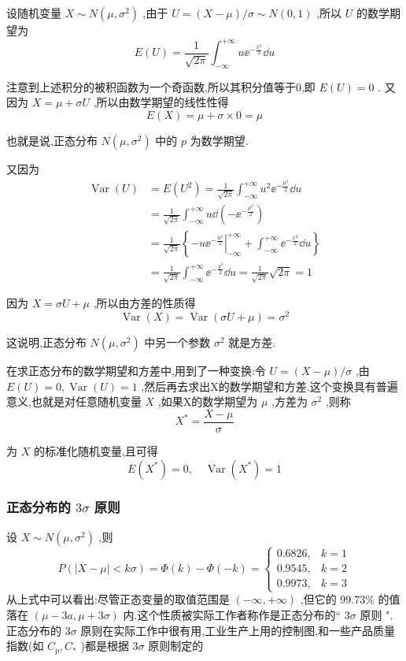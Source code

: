 设随机变量 $ X \sim N\left(\mu, \sigma^{2}\right) $ ,由于 $ U=(X-\mu) / \sigma \sim N(0,1) $ ,所以 $ U $ 的数学期望为
\[
E(U)=\frac{1}{\sqrt{2 \pi}} \int_{-\infty}^{+\infty} u \ee ^{-\frac{x^{2}}{2}} \dd u
\]

注意到上述积分的被积函数为一个奇函数,所以其积分值等于0,即 $ E(U)=0 $ .
又因为 $ X=\mu+\sigma U $ ,所以由数学期望的线性性得
\[
E(X)=\mu+\sigma \times 0=\mu
\]

也就是说,正态分布 $ N\left(\mu, \sigma^{2}\right) $ 中的 $ p $ 为数学期望.

又因为
\[
\begin{array}{ll}
{\operatorname{Var}(U)} & {=E\left(U^{2}\right)=\frac{1}{\sqrt{2 \pi}} \int_{-\infty}^{+\infty} u^{2} \ee ^{-\frac{\mu^{2}}{2}} \dd u} \\ 
{} & {=\frac{1}{\sqrt{2 \pi}} \int_{-\infty}^{+\infty} u \dd\left(-\ee ^{-\frac{\mu^{2}}{2}}\right)} \\ 
{} & {=\frac{1}{\sqrt{2 \pi}}\left\{-u\left.\ee ^{-\frac{u^{2}}{2}}\right|_{-\infty} ^{+\infty}+\int_{-\infty}^{+\infty} \ee ^{-\frac{x^{2}}{2}} \dd u\right\}} \\ 
{} & {=\frac{1}{\sqrt{2 \pi}} \int_{-\infty}^{+\infty} \ee ^{-\frac{y^{2}}{2}} \dd u=\frac{1}{\sqrt{2 \pi}} \sqrt{2 \pi}=1}
\end{array}
\]

因为 $ X=\sigma U+\mu $ ,所以由方差的性质得
\[
\operatorname{Var}(X)=\operatorname{Var}(\sigma U+\mu)=\sigma^{2}
\]

这说明,正态分布 $ N\left(\mu, \sigma^{2}\right) $ 中另一个参数 $ \sigma^{2} $ 就是方差.

在求正态分布的数学期望和方差中,用到了一种变换:令 $ U=(X-\mu) / \sigma $ ,由 $ E(U)=0, \operatorname{Var}(U)=1 $ ,然后再去求出X的数学期望和方差.这个变换具有普遍意义,也就是对任意随机变量 $ X $ ,如果X的数学期望为 $ \mu $ ,方差为 $ \sigma^{2} $ ,则称
\[
X^{*}=\frac{X-\mu}{\sigma}
\]

为 $ X $ 的标准化随机变量,且可得
\[
E\left(X^{*}\right)=0, \quad \operatorname{Var}\left(X^{*}\right)=1
\]

\subsubsection{正态分布的 $ 3\sigma $ 原则}
设 $ X \sim N\left(\mu, \sigma^{2}\right) $ ,则
\begin{equation}
P(|X-\mu|<k \sigma)=\Phi(k)-\Phi(-k)=\left\{\begin{array}{ll}{0.6826,} & {k=1} \\ {0.9545,} & {k=2} \\ {0.9973,} & {k=3}\end{array}\right. \label{eq:2.5.5}
\end{equation}
从上式中可以看出:尽管正态变量的取值范围是 $ (-\infty,+\infty) $ ,但它的 $ 99.73\% $ 的值落在 $ (\mu-3 a, \mu+3 \sigma) $ 内.这个性质被实际工作者称作是正态分布的`` $ 3\sigma $ 原则 ".正态分布的 $ 3\sigma $ 原则在实际工作中很有用,工业生产上用的控制图,和一些产品质量指数(如 $ C_{p}, C_{*} $ )都是根据 $ 3\sigma $ 原则制定的


